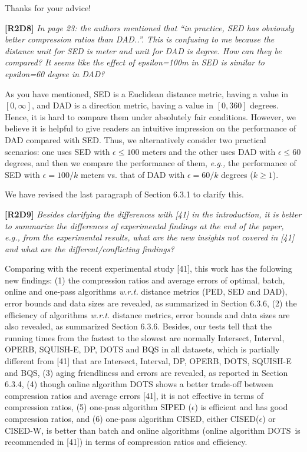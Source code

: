 \documentclass{letter}
\newcommand{\eg}{\emph{e.g.,}\xspace}
\newcommand{\wrt}{\emph{w.r.t.}\xspace}
\begin{document}
Thanks for your advice!


\textbf{[R2D8]} \emph{In page 23: the authors mentioned that ``in practice, SED has obviously better compression ratios than DAD..''. This is confusing to me because the distance unit for SED is meter and unit for DAD is degree. How can they be compared? It seems like the effect of epsilon=100m in SED is similar to epsilon=60 degree in DAD?}

As you have mentioned, SED is a Euclidean distance metric, having a value in $[0, \infty]$, and DAD is a direction metric, having a value in $[0, 360]$ degrees. Hence, it is hard to compare them under absolutely fair conditions. However, we believe it is helpful to give readers an intuitive impression on the performance of DAD compared with SED. Thus, we alternatively consider two practical scenarios: one uses SED with $\epsilon  \le  100$ meters and the other uses DAD with $\epsilon \le 60$ degrees, and then we compare the performance of them, \eg the performance of SED with $\epsilon=100/k$ meters vs. that of DAD with $\epsilon=60/k$ degrees ($k\ge 1$).


{We have revised the last paragraph of Section 6.3.1 to clarify this. }

\textbf{[R2D9]} \emph{Besides clarifying the differences with [41] in the introduction, it is better to summarize the differences of experimental findings at the end of the paper, e.g., from the experimental results, what are the new insights not covered in [41] and what are the different/conflicting findings?}

Comparing with the recent experimental study [41], this work has the following new findings:
(1) the compression ratios and average errors of optimal, batch, online and one-pass algorithms \wrt distance metrics (PED, SED and DAD), error bounds and data sizes are revealed, as summarized in Section 6.3.6,
(2) the efficiency of algorithms \wrt distance metrics, error bounds and data sizes are also revealed, as summarized Section 6.3.6. Besides, our tests tell that the running times from the fastest to the slowest are normally Intersect, Interval, OPERB, SQUISH-E, DP, DOTS and BQS in all datasets, which is partially different from [41] that are Intersect, Interval, DP, OPERB, DOTS, SQUISH-E and BQS,
(3) aging friendliness and errors are revealed, as reported in Section 6.3.4,
(4) though online algorithm DOTS shows a better trade-off between compression ratios and average errors [41], it is not effective in terms of compression ratios,
(5) one-pass algorithm SIPED ($\epsilon$) is efficient and has good compression ratios, and
(6) one-pass algorithm CISED, either CISED($\epsilon$) or CISED-W, is better than batch and online algorithms (online algorithm DOTS~is recommended in [41]) in terms of compression ratios and efficiency.
\end{document}
